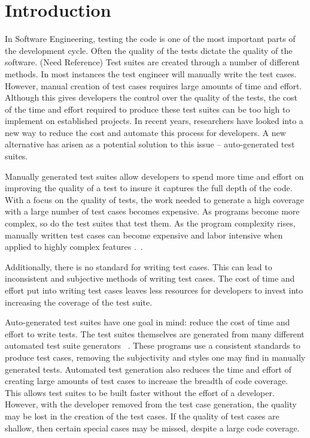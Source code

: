 \section{Introduction}
In Software Engineering, testing the code is one of the most important parts of the development cycle. Often the quality of the tests dictate the quality of the software. (Need Reference) Test suites are created through a number of different methods. In most instances the test engineer will manually write the test cases. However, manual creation of test cases requires large amounts of time and effort. Although this gives developers the control over the quality of the tests, the cost of the time and effort required to produce these test suites can be too high to implement on established projects. In recent years, researchers have looked into a new way to reduce the cost and automate this process for developers. A new alternative has arisen as a potential solution to this issue -- auto-generated test suites. 

Manually generated test suites allow developers to spend more time and effort on improving the quality of a test to insure it captures the full depth of the code. With a focus on the quality of tests, the work needed to generate a high coverage with a large number of test cases becomes expensive. As programs become more complex, so do the test suites that test them. As the program complexity rises, manually written test cases can become expensive and labor intensive when applied to highly complex features .~\cite{clarke1998automated}.

Additionally, there is no standard for writing test cases. This can lead to inconsistent and subjective methods of writing test cases. The cost of time and effort put into writing test cases leaves less resources for developers to invest into increasing the coverage of the test suite.

Auto-generated test suites have one goal in mind: reduce the cost of time and effort to write tests. The test suites themselves are generated from many different automated test suite generators ~\cite{Fraser:2011:EAT:2025113.2025179, Zhang:2011:PHA:1985793.1986036, Marinov:2001:TNF:872023.872551}. These programs use a consistent standards to produce test cases, removing the subjectivity and styles one may find in manually generated tests. Automated test generation also reduces the time and effort of creating large amounts of test cases to increase the breadth of code coverage. This allows test suites to be built faster without the effort of a developer. However, with the developer removed from the test case generation, the quality may be lost in the creation of the test cases. If the quality of test cases are shallow, then certain special cases may be missed, despite a large code coverage.

